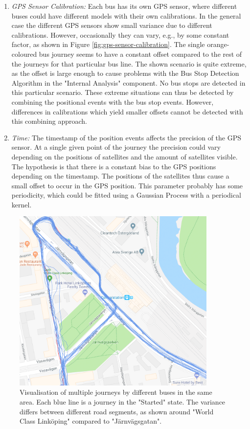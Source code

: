 \begin{enumerate}
    \item \textit{GPS Sensor Calibration:}
    Each bus has its own GPS sensor, where different buses could have different models with their own calibrations.
    In the general case the different GPS sensors show small variance due to different calibrations.
    However, occasionally they can vary, e.g., by some constant factor, as shown in Figure \ref{fig:gps-sensor-calibration}.
    The single orange-coloured bus journey seems to have a constant offset compared to the rest of the journeys for that particular bus line.
    The shown scenario is quite extreme, as the offset is large enough to cause problems with the Bus Stop Detection Algorithm in the "Internal Analysis" component.
    No bus stops are detected in this particular scenario.
    These extreme situations can thus be detected by combining the positional events with the bus stop events.
    However, differences in calibrations which yield smaller offsets cannot be detected with this combining approach.


    \item \textit{Time:}
    The timestamp of the position events affects the precision of the GPS sensor.
    At a single given point of the journey the precision could vary depending on the positions of satellites and the amount of satellites visible.
    The hypothesis is that there is a constant bias to the GPS positions depending on the timestamp.
    The positions of the satellites thus cause a small offset to occur in the GPS position.
    This parameter probably has some periodicity, which could be fitted using a Gaussian Process with a periodical kernel.
    
\end{enumerate} 


\begin{figure}[ht!]
    \centering
    \includegraphics[width=0.9\textwidth]{figures/gps_variation}
    \caption{Visualisation of multiple journeys by different buses in the same area.
    Each blue line is a journey in the "Started" state.
    The variance differs between different road segments, as shown around "World Class Linköping" compared to "Järnvägsgatan".}
    \label{fig:gps-variation}
\end{figure}

